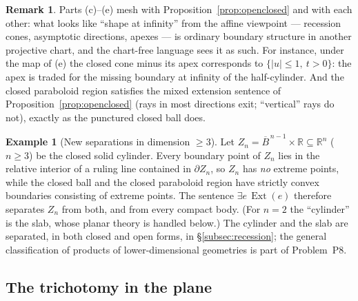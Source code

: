 \documentclass[11pt]{amsart}
\theoremstyle{definition}
\newtheorem{remark}[theorem]{Remark}
\newtheorem{example}[theorem]{Example}
\newcommand{\R}{\mathbb{R}}
\newcommand{\Ext}{\operatorname{Ext}}
\begin{document}
\begin{remark}\label{rem:apex}
Parts (c)--(e) mesh with Proposition~\ref{prop:openclosed} and with each
other: what looks like ``shape at infinity'' from the affine viewpoint ---
recession cones, asymptotic directions, apexes --- is ordinary boundary
structure in another projective chart, and the chart-free language sees it
as such. For instance, under the map of (e) the closed cone minus its apex
corresponds to $\{|u|\le1,\ t>0\}$: the apex is traded for the missing
boundary at infinity of the half-cylinder. And the closed paraboloid region
satisfies the mixed extension sentence of
Proposition~\ref{prop:openclosed} (rays in most directions exit; ``vertical''
rays do not), exactly as the punctured closed ball does.
\end{remark}

\begin{example}[New separations in dimension $\ge3$]\label{ex:cylinder}
Let $Z_n=\overline B^{\,n-1}\times\R\subseteq\R^n$ ($n\ge3$) be the closed
solid cylinder. Every boundary point of $Z_n$ lies in the relative interior
of a ruling line contained in $\partial Z_n$, so $Z_n$ has \emph{no} extreme
points, while the closed ball and the closed paraboloid region have strictly
convex boundaries consisting of extreme points. The sentence
$\exists e\,\Ext(e)$ therefore separates $Z_n$ from both, and from every
compact body. (For $n=2$ the ``cylinder'' is the slab, whose planar theory
is handled below.) The cylinder and the slab are separated, in both closed
and open forms, in \S\ref{subsec:recession}; the general classification of
products of lower-dimensional geometries is part of Problem~P8.
\end{example}

\subsection{The trichotomy in the plane}
\end{document}
